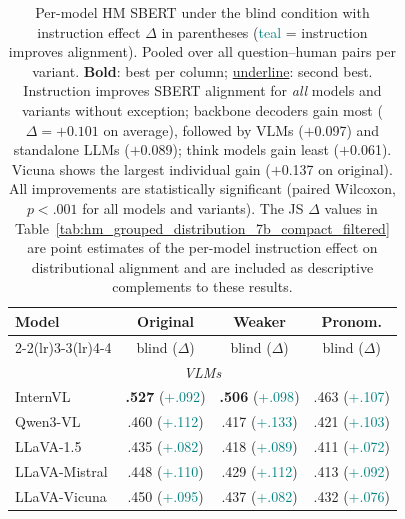 \begin{table}[t]
\centering\small
\setlength{\tabcolsep}{4pt}

\caption{Per-model HM SBERT under the blind condition with instruction effect $\Delta$ in parentheses (\textcolor{teal}{teal} = instruction improves alignment). Pooled over all question--human pairs per variant. \textbf{Bold}: best per column; \underline{underline}: second best. Instruction improves SBERT alignment for \emph{all} models and variants without exception; backbone decoders gain most ($\Delta{=}{+}0.101$ on average), followed by VLMs ($+$0.097) and standalone LLMs ($+$0.089); think models gain least ($+$0.061). Vicuna shows the largest individual gain ($+$0.137 on original). All improvements are statistically significant (paired Wilcoxon, $p{<}.001$ for all models and variants). The JS $\Delta$ values in Table~\ref{tab:hm_grouped_distribution_7b_compact_filtered} are point estimates of the per-model instruction effect on distributional alignment and are included as descriptive complements to these results.}
\label{tab:sbert_inst_effect}
\begin{tabular}{lccc}
\toprule
Model & \multicolumn{1}{c}{\textbf{Original}} & \multicolumn{1}{c}{\textbf{Weaker}} & \multicolumn{1}{c}{\textbf{Pronom.}} \\
\cmidrule(lr){2-2}\cmidrule(lr){3-3}\cmidrule(lr){4-4}
& \small blind ($\Delta$) & \small blind ($\Delta$) & \small blind ($\Delta$) \\
\midrule
\multicolumn{4}{c}{\textit{VLMs}} \\
\midrule
InternVL & \textbf{.527} {\scriptsize (\textcolor{teal}{+.092})} & \textbf{.506} {\scriptsize (\textcolor{teal}{+.098})} & .463 {\scriptsize (\textcolor{teal}{+.107})} \\
Qwen3-VL & .460 {\scriptsize (\textcolor{teal}{+.112})} & .417 {\scriptsize (\textcolor{teal}{+.133})} & .421 {\scriptsize (\textcolor{teal}{+.103})} \\
LLaVA-1.5 & .435 {\scriptsize (\textcolor{teal}{+.082})} & .418 {\scriptsize (\textcolor{teal}{+.089})} & .411 {\scriptsize (\textcolor{teal}{+.072})} \\
LLaVA-Mistral & .448 {\scriptsize (\textcolor{teal}{+.110})} & .429 {\scriptsize (\textcolor{teal}{+.112})} & .413 {\scriptsize (\textcolor{teal}{+.092})} \\
LLaVA-Vicuna & .450 {\scriptsize (\textcolor{teal}{+.095})} & .437 {\scriptsize (\textcolor{teal}{+.082})} & .432 {\scriptsize (\textcolor{teal}{+.076})} \\

\end{tabular}
\end{table}
